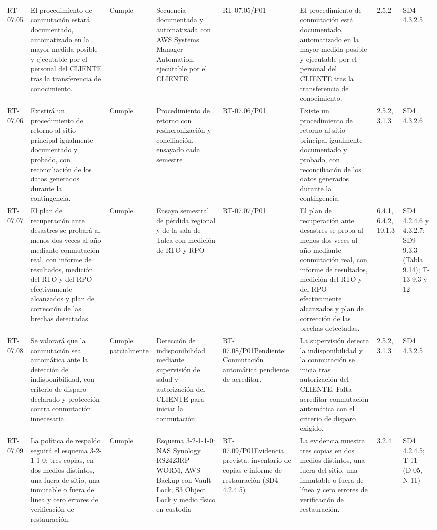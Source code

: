 \documentclass[oficio,firma,final]{lafrox}
\begin{document}
\begin{landscape}
{\begin{longtable}{@{}F{0.054} F{0.173} F{0.061} F{0.191} F{0.106} F{0.180} F{0.067} F{0.168}@{}}
  RT-07.05 & El procedimiento de conmutación estará documentado, automatizado en la mayor medida posible y ejecutable por el personal del CLIENTE tras la transferencia de conocimiento. & Cumple & Secuencia documentada y automatizada con AWS Systems Manager Automation, ejecutable por el CLIENTE & RT-07.05/\allowbreak{}P01 & El procedimiento de conmutación está documentado, automatizado en la mayor medida posible y ejecutable por el personal del CLIENTE tras la transferencia de conocimiento. & 2.5.2 & SD4 4.3.2.5  \\
  RT-07.06 & Existirá un procedimiento de retorno al sitio principal igualmente documentado y probado, con reconciliación de los datos generados durante la contingencia. & Cumple & Procedimiento de retorno con resincronización y conciliación, ensayado cada semestre & RT-07.06/\allowbreak{}P01 & Existe un procedimiento de retorno al sitio principal igualmente documentado y probado, con reconciliación de los datos generados durante la contingencia. & 2.5.2, 3.1.3 & SD4 4.3.2.6  \\
  RT-07.07 & El plan de recuperación ante desastres se probará al menos dos veces al año mediante conmutación real, con informe de resultados, medición del RTO y del RPO efectivamente alcanzados y plan de corrección de las brechas detectadas. & Cumple & Ensayo semestral de pérdida regional y de la sala de Talca con medición de RTO y RPO & RT-07.07/\allowbreak{}P01 & El plan de recuperación ante desastres se proba al menos dos veces al año mediante conmutación real, con informe de resultados, medición del RTO y del RPO efectivamente alcanzados y plan de corrección de las brechas detectadas. & 6.4.1, 6.4.2, 10.1.3 & SD4 4.2.4.6 y 4.3.2.7; SD9 9.3.3 (Tabla 9.14); T-13 9.3 y 12  \\
  RT-07.08 & Se valorará que la conmutación sea automática ante la detección de indisponibilidad, con criterio de disparo declarado y protección contra conmutación innecesaria. & Cumple parcialmente & Detección de indisponibilidad mediante supervisión de salud y autorización del CLIENTE para iniciar la conmutación. & RT-07.08/\allowbreak{}P01\newline Pendiente: Conmutación automática pendiente de acreditar. & La supervisión detecta la indisponibilidad y la conmutación se inicia tras autorización del CLIENTE. Falta acreditar conmutación automática con el criterio de disparo exigido. & 2.5.2, 3.1.3 & SD4 4.3.2.5  \\
  RT-07.09 & La política de respaldo seguirá el esquema 3-2-1-1-0: tres copias, en dos medios distintos, una fuera de sitio, una inmutable o fuera de línea y cero errores de verificación de restauración. & Cumple & Esquema 3-2-1-1-0: NAS Synology RS2423RP+ WORM, AWS Backup con Vault Lock, S3 Object Lock y medio físico en custodia & RT-07.09/\allowbreak{}P01\newline Evidencia prevista: inventario de copias e informe de restauración (SD4 4.2.4.5) & La evidencia muestra tres copias en dos medios distintos, una fuera del sitio, una inmutable o fuera de línea y cero errores de verificación de restauración. & 3.2.4 & SD4 4.2.4.5; T-11 (D-05, N-11)  \\

\end{longtable}}
\end{landscape}
\end{document}
